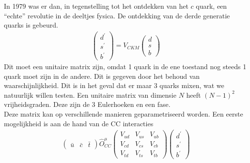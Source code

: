 \documentclass[../main.tex]{subfiles}
\begin{document}
In 1979 was er dan, in tegenstelling tot het ontdekken van het $c$ quark, een ``echte'' revolutie in de deeltjes fysica. De ontdekking van de derde generatie quarks is gebeurd.
\begin{equation}
    \begin{aligned}
        \label{eq:ckm_mat}
        \left(\begin{array}{c}
                d^{\prime} \\
                s^{\prime} \\
                b^{\prime}
                \end{array}\right)=V_{C K M}\left(\begin{array}{l}
                d \\
                s \\
                b
        \end{array}\right)
    \end{aligned}
\end{equation}
Dit moet een unitaire matrix zijn, omdat 1 quark in de ene toestand nog steeds 1 quark moet zijn in de andere. Dit is gegeven door het behoud van waarschijnlijkheid. Dit is in het geval dat er maar 3 quarks mixen, wat we natuurlijk willen testen. Een unitaire matrix van dimensie $N$ heeft $(N-1)^2$ vrijheidsgraden. Deze zijn de 3 Eulerhoeken en een fase.\\
Deze matrix kan op verschillende manieren geparametriseerd worden. Een eerste mogelijkheid is aan de hand van de CC interacties
\begin{equation}
    \begin{aligned}
        \label{eq:cc_int_ckm}
        \left(\begin{array}{ccc}
                \bar{u} & \bar{c} & \bar{t}
                \end{array}\right) \hat{O}_{C C}^{\mu}\left(\begin{array}{ccc}
                V_{u d} & V_{u s} & V_{u b} \\
                V_{c d} & V_{c s} & V_{c b} \\
                V_{t d} & V_{t s} & V_{t b}
                \end{array}\right)\left(\begin{array}{l}
                d^{\prime} \\
                s^{\prime} \\
                b^{\prime}
        \end{array}\right)
    \end{aligned}
\end{equation}
\end{document}
